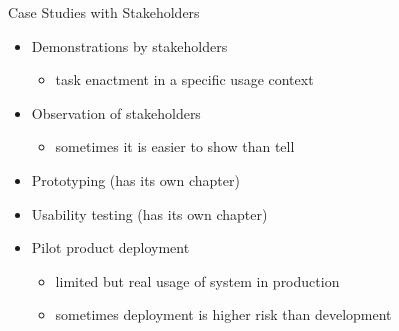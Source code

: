 \begin{Slide}{Case Studies with Stakeholders}
\begin{itemize}
\item Demonstrations by stakeholders
\begin{itemize}
\item task enactment in a specific usage context
\end{itemize}
\item Observation of stakeholders 
\begin{itemize}
\item sometimes it is easier to show than tell
\end{itemize}
\item Prototyping (has its own chapter) 
\item Usability testing (has its own chapter)
\item Pilot product deployment
\begin{itemize}
\item limited but real usage of system in production
\item sometimes deployment is higher risk than development

\end{itemize}
\end{itemize}
\end{Slide}